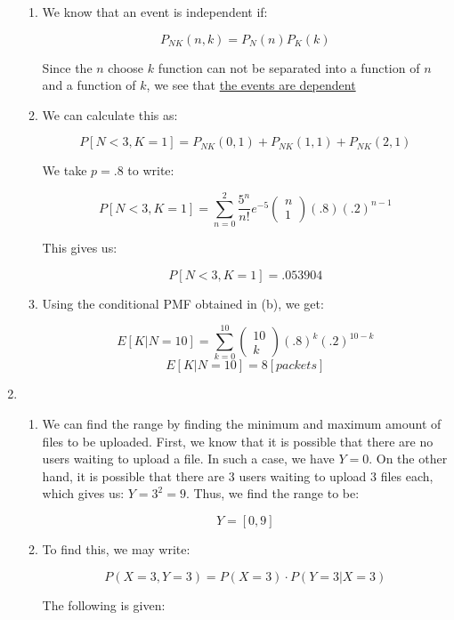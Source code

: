 \begin{enumerate}
\begin{enumerate}
      \item We know that an event is independent if:

        $$P_{NK}(n,k)=P_N(n)P_K(k)$$

        Since the $n$ choose $k$ function can not be separated into a function of $n$ and a function of $k$, we see that \underline{the events are dependent}

      \item We can calculate this as:

        $$P[N<3,K=1]=P_{NK}(0,1)+P_{NK}(1,1)+P_{NK}(2,1)$$

        We take $p=.8$ to write:

        $$P[N<3,K=1]=\sum_{n=0}^2 \frac{5^n}{n!}e^{-5}\left( \begin{matrix}n\\1\end{matrix} \right)(.8)(.2)^{n-1}$$

        This gives us:

        $$\boxed{P[N<3,K=1]=.053904}$$

      \item Using the conditional PMF obtained in (b), we get:

        $$E[K|N=10]=\sum_{k=0}^{10}\left( \begin{matrix}10\\k\end{matrix} \right)(.8)^k(.2)^{10-k}$$
        $$\boxed{E[K|N=10]=8[\si{packets}]}$$

    \end{enumerate}

  \item

    \begin{enumerate}

      \item We can find the range by finding the minimum and maximum amount of files to be uploaded. First, we know that it is possible that there are no users waiting to upload a file. In such a case, we have $Y=0$. On the other hand, it is possible that there are 3 users waiting to upload 3 files each, which gives us: $Y=3^2=9$. Thus, we find the range to be:

        $$\boxed{Y=[0,9]}$$

      \item To find this, we may write:

        $$P(X=3,Y=3)=P(X=3)\cdot P(Y=3|X=3)$$

        The following is given:


\end{enumerate}
\end{enumerate}
